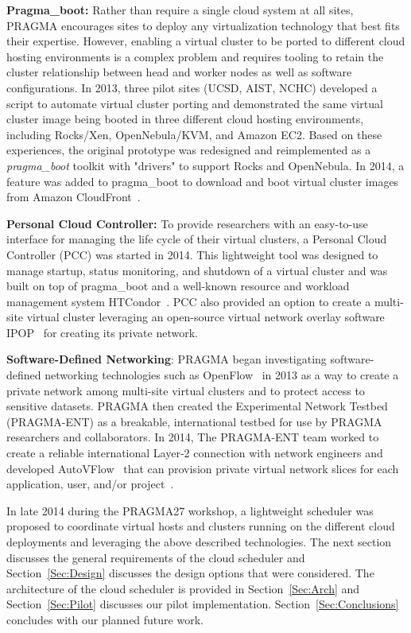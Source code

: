 \documentclass[times]{cpeauth}
\begin{document}
\textbf{Pragma\_boot:}  Rather than require a single cloud system at all sites, PRAGMA encourages sites to  deploy any virtualization technology that best fits their expertise. However, enabling a virtual cluster to be ported to different cloud hosting environments is a complex problem and requires tooling to retain the cluster relationship between head and worker nodes as well as software configurations.  In 2013, three pilot sites (UCSD, AIST, NCHC) developed a script to automate virtual cluster porting and demonstrated the same virtual cluster image being booted in three different cloud hosting environments, including Rocks/Xen, OpenNebula/KVM, and Amazon EC2.  Based on these experiences, the original prototype was redesigned and reimplemented as a \textit{pragma\_boot} toolkit with "drivers" to support  Rocks and OpenNebula.  In 2014, a feature was added to pragma\_boot to download and boot virtual cluster images from Amazon CloudFront~\cite{cloudfront}.

\textbf{Personal Cloud Controller:}  To provide researchers with an easy-to-use interface for managing the life cycle of their virtual clusters, a Personal Cloud Controller (PCC)  was started in 2014. This lightweight tool was designed to manage startup, status monitoring, and shutdown of a virtual cluster and was built on top of pragma\_boot and a well-known resource and workload management system HTCondor~\cite{condor}.   PCC also provided an option to create a multi-site virtual cluster leveraging an open-source virtual network overlay software IPOP~\cite{ipop} for creating its private network.  

\textbf{Software-Defined Networking}:   PRAGMA began investigating software-defined networking technologies such as OpenFlow~\cite{openflow} in 2013 as a way to create a private network among multi-site virtual clusters and to protect access to sensitive datasets.  PRAGMA then created the Experimental Network Testbed (PRAGMA-ENT) as a breakable, international testbed for use by PRAGMA researchers and collaborators.  In 2014, The PRAGMA-ENT team worked to create a reliable international Layer-2 connection with network engineers and developed AutoVFlow~\cite{autovflow} that can provision private virtual network slices for each application, user, and/or project~\cite{pragmaReport2014}.  

In late 2014 during the PRAGMA27 workshop, a lightweight scheduler was proposed to coordinate virtual hosts and clusters running on the different cloud deployments  and leveraging the above described technologies.  The next section discusses the general requirements of the cloud scheduler and Section~\ref{Sec:Design} discusses the design options that were considered.  The architecture of the cloud scheduler is provided in Section~\ref{Sec:Arch} and Section~\ref{Sec:Pilot} discusses our pilot implementation.  Section~\ref{Sec:Conclusions} concludes with our planned future work.  
\end{document}
